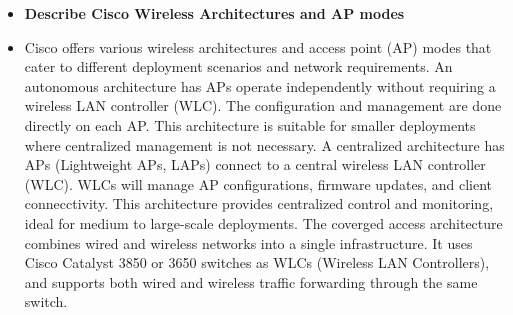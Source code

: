 \documentclass{article}
\begin{document}
\begin{itemize}
  \item \textbf{Describe Cisco Wireless Architectures and AP modes}
  	\item[] Cisco offers various wireless architectures and access point (AP) modes that cater to different deployment scenarios and network requirements. An autonomous architecture has APs operate independently without requiring a wireless LAN controller (WLC). The configuration and management are done directly on each AP. This architecture is suitable for smaller deployments where centralized management is not necessary. A centralized architecture has APs (Lightweight APs, LAPs) connect to a central wireless LAN controller (WLC). WLCs will manage AP configurations, firmware updates, and client connecctivity. This architecture provides centralized control and monitoring, ideal for medium to large-scale deployments. The coverged access architecture combines wired and wireless networks into a single infrastructure. It uses Cisco Catalyst 3850 or 3650 switches as WLCs (Wireless LAN Controllers), and supports both wired and wireless traffic forwarding through the same switch.

\end{itemize}
\end{document}
